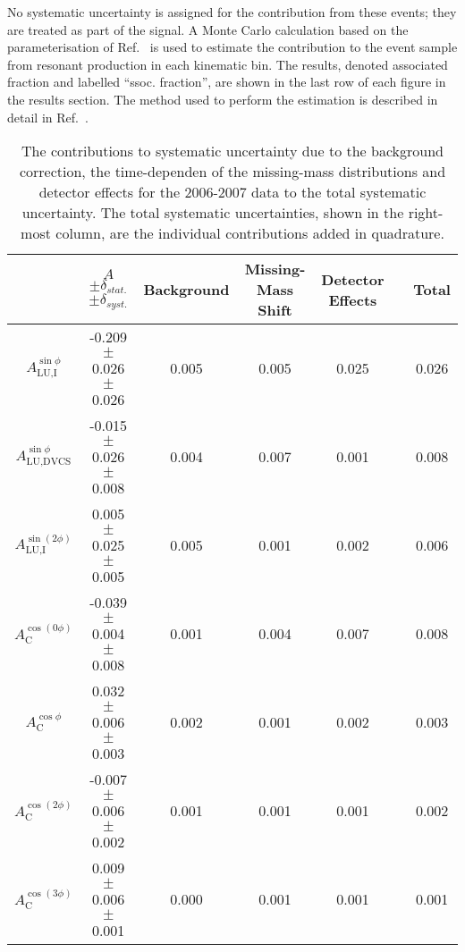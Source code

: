 No systematic uncertainty is assigned for the contribution from these events; they are treated as part of the signal. A Monte Carlo calculation based on the parameterisation of Ref.~\cite{Bra76} is used to estimate the contribution to the event sample from resonant production in each kinematic bin. The results, denoted associated fraction and labelled ``ssoc. fraction'', are shown in the last row of each figure in the results section. The method used to perform the estimation is described in detail in
Ref.~\cite{Air08}.

\begin{table}[H]
 \begin{center}
\resizebox{16cm}{!} {
 \begin{tabular}{|c|c|c|c|c|c|c|}
  \hline
 & $A$ $\pm \delta_{stat.}$ $\pm \delta_{syst.}$ & Background & Missing-Mass Shift & Detector Effects & & Total \\
  \hline
  \hline
  $A_{\textrm{LU,I}}^{\sin\phi}$ & -0.209  $\pm$  0.026  $\pm$   0.026 & 0.005 & 0.005 & 0.025 & & 0.026 \\
  \hline
  $A_{\textrm{LU,DVCS}}^{\sin\phi}$ & -0.015  $\pm$  0.026  $\pm$  0.008 & 0.004 & 0.007 & 0.001 & & 0.008 \\
  \hline
  $A_{\textrm{LU,I}}^{\sin(2\phi)}$ & 0.005  $\pm$  0.025  $\pm$   0.005 & 0.005 & 0.001 & 0.002 & & 0.006 \\
  \hline
  \hline
  $A_{\textrm{C}}^{\cos(0\phi)}$ & -0.039 $\pm$  0.004 $\pm$  0.008 & 0.001 & 0.004 & 0.007 & & 0.008 \\
  \hline
  $A_{\textrm{C}}^{\cos\phi}$ & 0.032  $\pm$  0.006 $\pm$   0.003 & 0.002 & 0.001 & 0.002 & & 0.003 \\
  \hline
  $A_{\textrm{C}}^{\cos(2\phi)}$ & -0.007  $\pm$  0.006  $\pm$   0.002 & 0.001 & 0.001 & 0.001 & & 0.002 \\
  \hline
  $A_{\textrm{C}}^{\cos(3\phi)}$ & 0.009  $\pm$   0.006   $\pm$   0.001 & 0.000 & 0.001 & 0.001 & & 0.001 \\
  \hline
 \end{tabular}
}
  \caption{The contributions to  systematic uncertainty due to the
background correction, the time-dependen of the missing-mass
distributions and detector effects for the 2006-2007 data to the total
systematic uncertainty. The total systematic uncertainties, shown in the
right-most column, are the individual contributions added in quadrature.}
  \label{table_systematic_contributions_0607}
\end{center}
\end{table}

